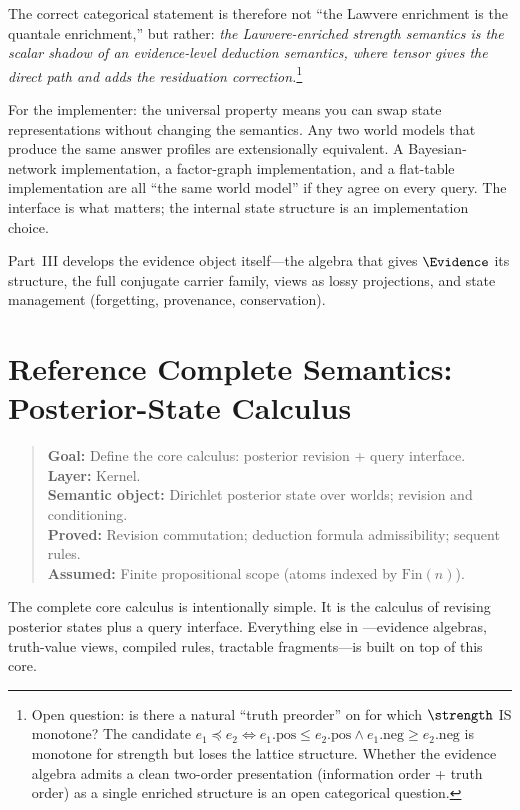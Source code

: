 \documentclass[11pt,openany]{report}
\begin{document}
\noindent
The correct categorical statement is therefore not ``the Lawvere
enrichment is the quantale enrichment,'' but rather: \emph{the
Lawvere-enriched strength semantics is the scalar shadow of an
evidence-level deduction semantics, where tensor gives the direct
path and  adds the residuation
correction.}\footnote{Open question: is there a natural ``truth
preorder'' on \Evidence{} for which $\strength$ IS monotone?  The
candidate $e_1 \preceq e_2 \iff e_1.\mathrm{pos} \le e_2.\mathrm{pos}
\wedge e_1.\mathrm{neg} \ge e_2.\mathrm{neg}$ is monotone for strength
but loses the lattice structure.  Whether the evidence algebra admits
a clean two-order presentation (information order + truth order) as a
single enriched structure is an open categorical question.}

\medskip\noindent
For the implementer: the universal property means you can swap state
representations without changing the semantics.  Any two world models
that produce the same answer profiles are extensionally equivalent.  A
Bayesian-network implementation, a factor-graph implementation, and a
flat-table implementation are all ``the same world model'' if they agree
on every query.  The interface is what matters; the internal state
structure is an implementation choice.

Part~III develops the evidence object itself---the algebra that gives
$\Evidence$ its structure, the full conjugate carrier family, views as
lossy projections, and state management (forgetting, provenance,
conservation).


\chapter{Reference Complete Semantics: Posterior-State Calculus}
\label{ch:posterior-state}

\begin{quote}\small
\textbf{Goal:} Define the core calculus: posterior revision + query interface.\\
\textbf{Layer:} Kernel.\\
\textbf{Semantic object:} Dirichlet posterior state over worlds; revision and conditioning.\\
\textbf{Proved:} Revision commutation; deduction formula admissibility; sequent rules.\\
\textbf{Assumed:} Finite propositional scope (atoms indexed by $\mathrm{Fin}(n)$).
\end{quote}

The complete core calculus is intentionally simple.  It is the calculus of
revising posterior states plus a query interface.  Everything else in
\xiPLN{}---evidence algebras, truth-value views, compiled rules, tractable
fragments---is built on top of this core.
\end{document}

